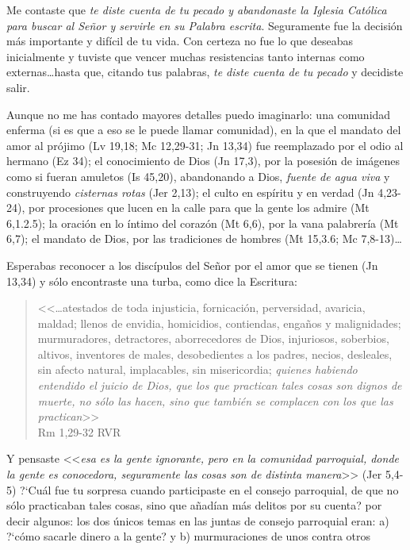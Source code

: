 \documentclass{article}
\begin{document}
\noindent
Me contaste que \emph{te diste cuenta de tu pecado y abandonaste la Iglesia Cat\'olica para buscar al Se\~nor y servirle en su Palabra escrita}. Seguramente fue la decisi\'on m\'as importante y dif\'{i}cil de tu vida. Con certeza no fue lo que deseabas inicialmente y tuviste que vencer muchas resistencias tanto internas como externas\ldots hasta que, citando tus palabras, \emph{te diste cuenta de tu pecado} y decidiste salir.

Aunque no me has contado mayores detalles puedo imaginarlo: una comunidad enferma (si es que a eso se le puede llamar comunidad), en la que el mandato del amor al pr\'ojimo (Lv 19,18; Mc 12,29-31; Jn 13,34) fue reemplazado por el odio al hermano (Ez 34); el conocimiento de Dios (Jn 17,3), por la posesi\'on de im\'agenes como si fueran amuletos (Is 45,20), abandonando a Dios, \emph{fuente de agua viva} y construyendo \emph{cisternas rotas} (Jer 2,13); el culto en esp\'{i}ritu y en verdad (Jn 4,23-24), por procesiones que lucen en la calle para que la gente los admire (Mt 6,1.2.5); la oraci\'on en lo \'{i}ntimo del coraz\'on (Mt 6,6), por la vana palabrer\'{i}a (Mt 6,7); el mandato de Dios, por las tradiciones de hombres (Mt 15,3.6; Mc 7,8-13)\ldots

Esperabas reconocer a los disc\'{i}pulos del Se\~nor por el amor que se tienen (Jn 13,34) y s\'olo encontraste una turba, como dice la Escritura:

\begin{quote}
<<\ldots atestados de toda injusticia, fornicación, perversidad, avaricia, maldad; llenos de envidia, homicidios, contiendas, engaños y malignidades; murmuradores, detractores, aborrecedores de Dios, injuriosos, soberbios, altivos, inventores de males, desobedientes a los padres, necios, desleales, sin afecto natural, implacables, sin misericordia; \emph{quienes habiendo entendido el juicio de Dios, que los que practican tales cosas son dignos de muerte, no sólo las hacen, sino que también se complacen con los que las practican}>>\\
Rm 1,29-32 RVR
\end{quote}

\noindent
Y pensaste <<\emph{esa es la gente ignorante, pero en la comunidad parroquial, donde la gente es conocedora, seguramente las cosas son de distinta manera}>> (Jer 5,4-5) ?`Cu\'al fue tu sorpresa cuando participaste en el consejo parroquial, de que no s\'olo practicaban tales cosas, sino que a\~nad\'{i}an m\'as delitos por su cuenta? por decir algunos: los dos \'unicos temas en las juntas de consejo parroquial eran: a) ?`c\'omo sacarle dinero a la gente? y b) murmuraciones de unos contra otros
\end{document}
